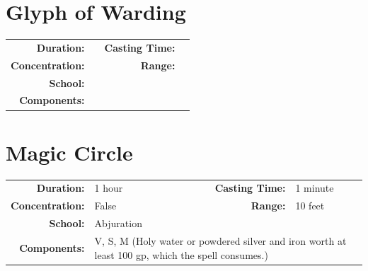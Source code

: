 \documentclass[12pt,showtrims]{memoir}
\begin{document}
\section*{Glyph of Warding}
{
\small\centering\vspace{-6pt}
\begin{tabular}{rlrl}
\toprule

\textbf{Duration:} &  &
\textbf{Casting Time:} &  \\
\textbf{Concentration:} & &
\textbf{Range:} &  \\
\textbf{School:} &  \\
\textbf{Components:} & \multicolumn{3}{p{0.7\textwidth}}{}\\

\bottomrule
\end{tabular}
}
\newpage
\section*{Magic Circle}

{
\small\centering\vspace{-6pt}
\begin{tabular}{rlrl}
\toprule

\textbf{Duration:} & 1 hour &
\textbf{Casting Time:} & 1 minute \\
\textbf{Concentration:} & False &
\textbf{Range:} & 10 feet \\
\textbf{School:} & Abjuration \\
\textbf{Components:} & \multicolumn{3}{p{0.7\textwidth}}{V, S, M (Holy water or powdered silver and iron worth at least 100 gp, which the spell consumes.)}\\

\bottomrule
\end{tabular}
}
\end{document}

